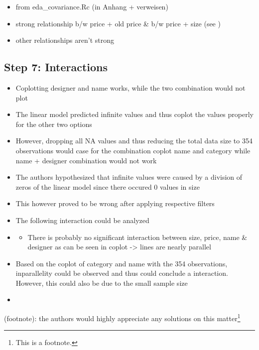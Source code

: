 \documentclass[a4paper, nobind]{templates/ociamthesis}
\providecommand{\tightlist}{%
  \setlength{\itemsep}{0pt}\setlength{\parskip}{0pt}}
\begin{document}
\begin{itemize}
\tightlist
\item
  from eda\_covariance.Rc (in Anhang + verweisen)
\item
  strong relationship b/w price + old price \& b/w price + size (see )
\item
  other relationships aren't strong
\end{itemize}

\hypertarget{step-7-interactions}{%
\subsection{Step 7: Interactions}\label{step-7-interactions}}

\begin{itemize}
\item
  Coplotting designer and name works, while the two combination would not plot
\item
  The linear model predicted infinite values and thus coplot the values properly for the other two options
\item
  However, dropping all NA values and thus reducing the total data size to 354 observations would case for the combination coplot name and category while name + designer combination would not work
\item
  The authors hypothesized that infinite values were caused by a division of zeros of the linear model since there occured 0 values in size
\item
  This however proved to be wrong after applying respective filters
\item
  The following interaction could be analyzed
\item
  \begin{itemize}
  \tightlist
  \item
    There is probably no significant interaction between size, price, name \& designer as can be seen in coplot -\textgreater{} lines are nearly parallel
  \end{itemize}
\item
  Based on the coplot of category and name with the 354 observations, inparallelity could be observed and thus could conclude a interaction. However, this could also be due to the small sample size
\item
\end{itemize}

(footnote): the authors would highly appreciate any solutions on this matter\footnote{This is a footnote.}
\end{document}
